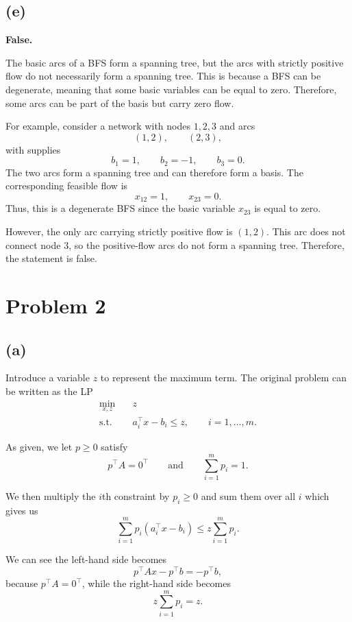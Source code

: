 \documentclass{article}
\begin{document}
\newpage




\subsection*{(e)}

\textbf{False.}

The basic arcs of a BFS form a spanning tree, but the arcs with strictly
positive flow do not necessarily form a spanning tree. This is because
a BFS can be degenerate, meaning that some basic variables can be equal
to zero. Therefore, some arcs can be part of the basis but carry zero
flow.

For example, consider a network with nodes $1,2,3$ and arcs
\[
(1,2), \qquad (2,3),
\]
with supplies
\[
b_1=1,\qquad b_2=-1,\qquad b_3=0.
\]
The two arcs form a spanning tree and can therefore form a basis. The
corresponding feasible flow is
\[
x_{12}=1,\qquad x_{23}=0.
\]
Thus, this is a degenerate BFS since the basic variable $x_{23}$ is
equal to zero.

However, the only arc carrying strictly positive flow is $(1,2)$. This
arc does not connect node $3$, so the positive-flow arcs do not form a
spanning tree. Therefore, the statement is false.


\newpage


\section*{Problem 2}

\subsection*{(a)}


Introduce a variable $z$ to represent the maximum term. The original
problem can be written as the LP
\[
\begin{aligned}
\min_{x,z}\quad & z\\
\text{s.t.}\quad & a_i^\top x-b_i\leq z,
\qquad i=1,\ldots,m.
\end{aligned}
\]

As given, we let $p\geq0$ satisfy
\[
p^\top A=0^\top
\qquad\text{and}\qquad
\sum_{i=1}^m p_i=1.
\]

We then multiply the $i$th constraint by $p_i\geq0$ and sum them over all $i$ which gives us
\[
\sum_{i=1}^m p_i(a_i^\top x-b_i)
\leq
z\sum_{i=1}^m p_i.
\]

We can see the left-hand side becomes
\[
p^\top Ax-p^\top b
=
-p^\top b,
\]
because $p^\top A=0^\top$, while the right-hand side becomes
\[
z\sum_{i=1}^m p_i=z.
\]
\end{document}
